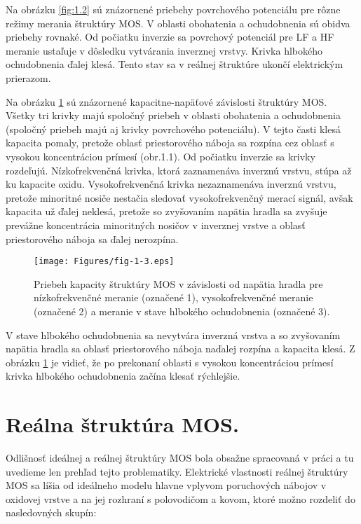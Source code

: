 \par Na obrázku \ref{fig:1.2} sú znázornené priebehy povrchového
potenciálu pre rôzne režimy merania štruktúry MOS. V oblasti
obohatenia a ochudobnenia sú obidva priebehy rovnaké. Od počiatku
inverzie sa povrchový potenciál pre LF a HF meranie ustaľuje v
dôsledku vytvárania inverznej vrstvy.  Krivka hlbokého ochudobnenia
ďalej klesá. Tento stav sa v reálnej štruktúre ukončí elektrickým
prierazom.

\par Na obrázku \ref{fig:1.3} sú znázornené kapacitne-napäťové
závislosti štruktúry MOS. Všetky tri krivky majú spoločný priebeh v
oblasti obohatenia a ochudobnenia (spoločný priebeh majú aj krivky
povrchového potenciálu). V tejto časti klesá kapacita pomaly, pretože
oblasť priestorového náboja sa rozpína cez oblasť s vysokou
koncentráciou prímesí (obr.1.1). Od počiatku inverzie sa krivky
rozdeľujú. Nízkofrekvenčná krivka, ktorá zaznamenáva inverznú vrstvu,
stúpa až ku kapacite oxidu. Vysokofrekvenčná krivka nezaznamenáva
inverznú vrstvu, pretože minoritné nosiče nestačia sledovať
vysokofrekvenčný merací signál, avšak kapacita už ďalej neklesá,
pretože so zvyšovaním napätia hradla sa zvyšuje prevážne koncentrácia
minoritných nosičov v inverznej vrstve a oblasť priestorového náboja
sa ďalej nerozpína.

\begin{figure}[h!]\centering
\texttt{[image: Figures/fig-1-3.eps]}
\captionsetup{justification=raggedright, singlelinecheck=false}
\caption[Priebeh kapacity štruktúry MOS v závislosti od napätia
  hradla]{Priebeh kapacity štruktúry MOS v závislosti od napätia
  hradla pre nízkofrekvenčné meranie (označené 1), vysokofrekvenčné
  meranie (označené 2) a meranie v stave hlbokého ochudobnenia
  (označené 3).}
\label{fig:1.3}
\end{figure}

\par V stave hlbokého ochudobnenia sa nevytvára inverzná vrstva a so
zvyšovaním napätia hradla sa oblasť priestorového náboja naďalej
rozpína a kapacita klesá. Z obrázku \ref{fig:1.3} je vidieť, že po
prekonaní oblasti s vysokou koncentráciou prímesí krivka hlbokého
ochudobnenia začína klesať rýchlejšie.


\section{Reálna štruktúra MOS.}  Odlišnosť ideálnej a reálnej
štruktúry MOS bola obsažne spracovaná v práci \cite{1.12} a tu
uvedieme len prehľad tejto problematiky. Elektrické vlastnosti reálnej
štruktúry MOS sa líšia od ideálneho modelu hlavne vplyvom poruchových
nábojov v oxidovej vrstve a na jej rozhraní s polovodičom a kovom,
ktoré možno rozdeliť do nasledovných skupín:

